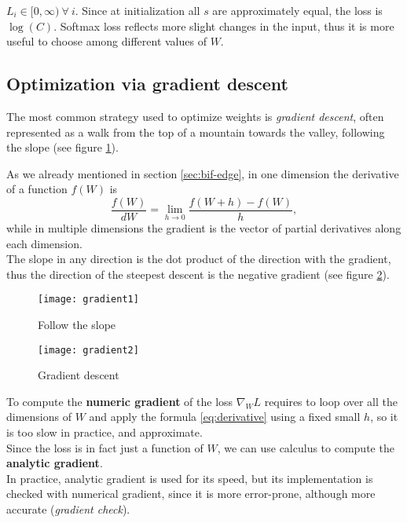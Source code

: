 \obs $L_i \in [0, \infty)\ \forall\ i$.
\obs Since at initialization all $s$ are approximately equal, the loss is $\log(C)$.
\obs Softmax loss reflects more slight changes in the input, thus it is more useful to choose among different values of $W$.


\subsection{Optimization via gradient descent}\label{sec:ic-gradient-descent}

The most common strategy used to optimize weights is \textit{gradient descent}, often represented as a walk from the top of a mountain towards the valley, following the slope (see figure \ref{fig:gradient1}).

As we already mentioned in section \ref{sec:bif-edge}, in one dimension the derivative of a function $f(W)$ is
\begin{equation}\label{eq:derivative}
    \frac{f(W)}{dW} = \lim_{h \to 0} \frac{f(W + h) - f(W)}{h},
\end{equation}
while in multiple dimensions the gradient is the vector of partial derivatives along each dimension.\\
The slope in any direction is the dot product of the direction with the gradient, thus the direction of the steepest descent is the negative gradient (see figure \ref{fig:gradient2}).

\begin{minipage}{.5\linewidth}
    \begin{figure}[H]
        \centering
        \texttt{[image: gradient1]}
        \caption[Follow the slope]{Follow the slope}
        \label{fig:gradient1}
    \end{figure}
\end{minipage}
\begin{minipage}{.5\linewidth}
    \begin{figure}[H]
        \centering
        \texttt{[image: gradient2]}
        \caption[Gradient descent]{Gradient descent}
        \label{fig:gradient2}
    \end{figure}
\end{minipage}

To compute the \textbf{numeric gradient} of the loss $\nabla_W L$ requires to loop over all the dimensions of $W$ and apply the formula \ref{eq:derivative} using a fixed small $h$, so it is too slow in practice, and approximate.\\
Since the loss is in fact just a function of $W$, we can use calculus to compute the \textbf{analytic gradient}.\\
In practice, analytic gradient is used for its speed, but its implementation is checked with numerical gradient, since it is more error-prone, although more accurate (\textit{gradient check}).

